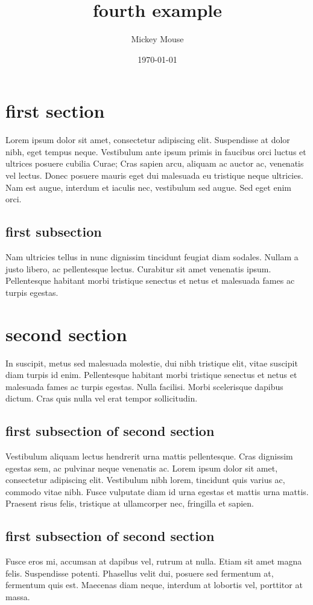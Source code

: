 \documentclass[a4paper]{article}
\author{Mickey Mouse}
\date{\today}
\title{fourth example}
\begin{document}
\maketitle

\tableofcontents

\section{first section}

Lorem ipsum dolor sit amet, consectetur adipiscing elit. Suspendisse at dolor
nibh, eget tempus neque. Vestibulum ante ipsum primis in faucibus orci luctus
et ultrices posuere cubilia Curae; Cras sapien arcu, aliquam ac auctor ac,
venenatis vel lectus. Donec posuere mauris eget dui malesuada eu tristique
neque ultricies. Nam est augue, interdum et iaculis nec, vestibulum sed augue.
Sed eget enim orci.


\subsection{first subsection}

Nam ultricies tellus in nunc dignissim tincidunt feugiat diam sodales. Nullam a
justo libero, ac pellentesque lectus. Curabitur sit amet venenatis ipsum.
Pellentesque habitant morbi tristique senectus et netus et malesuada fames ac
turpis egestas.


\section{second section}

In suscipit, metus sed malesuada molestie, dui nibh tristique elit, vitae
suscipit diam turpis id enim. Pellentesque habitant morbi tristique senectus et
netus et malesuada fames ac turpis egestas. Nulla facilisi. Morbi scelerisque
dapibus dictum. Cras quis nulla vel erat tempor sollicitudin.


\subsection{first subsection of second section}

Vestibulum aliquam lectus hendrerit urna mattis pellentesque. Cras dignissim
egestas sem, ac pulvinar neque venenatis ac. Lorem ipsum dolor sit amet,
consectetur adipiscing elit. Vestibulum nibh lorem, tincidunt quis varius ac,
commodo vitae nibh. Fusce vulputate diam id urna egestas et mattis urna mattis.
Praesent risus felis, tristique at ullamcorper nec, fringilla et sapien.


\subsection{first subsection of second section}

Fusce eros mi, accumsan at dapibus vel, rutrum at nulla. Etiam sit amet magna
felis. Suspendisse potenti. Phasellus velit dui, posuere sed fermentum at,
fermentum quis est. Maecenas diam neque, interdum at lobortis vel, porttitor
at massa.
\end{document}
